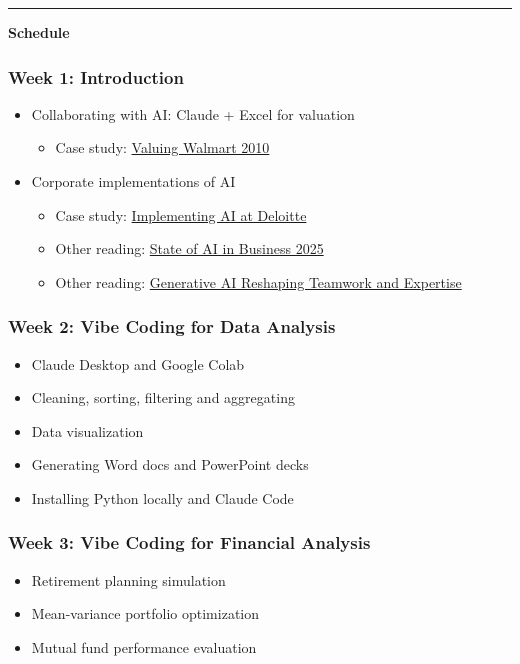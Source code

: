\documentclass[11pt]{article}
\begin{document}
\vspace{1cm}
\hrule
\vspace{0.5cm}

\begin{center}
\textbf{\Large  Schedule}
\end{center}

\subsubsection*{Week 1: Introduction}
\begin{itemize}\setlength{\itemsep}{0pt}
\item Collaborating with AI: Claude + Excel for valuation
\begin{itemize}
\item Case study: \href{https://hbsp.harvard.edu/product/W11058-PDF-ENG}{Valuing Walmart 2010}
\end{itemize}
\item Corporate implementations of AI
\begin{itemize}

\item Case study: \href{https://hbsp.harvard.edu/product/HEC382-PDF-ENG}{Implementing AI at Deloitte}
\item Other reading: 
\href{https://mlq.ai/media/quarterly_decks/v0.1_State_of_AI_in_Business_2025_Report.pdf}{State of AI in Business 2025}
\item
Other reading: \href{https://papers.ssrn.com/sol3/papers.cfm?abstract_id=5188231}{Generative AI Reshaping Teamwork and Expertise}
\end{itemize}
\end{itemize}

\subsubsection*{Week 2: Vibe Coding for Data Analysis}
\begin{itemize}\setlength{\itemsep}{0pt}
\item Claude Desktop and Google Colab
\item Cleaning, sorting, filtering and aggregating
\item Data visualization
\item Generating Word docs and PowerPoint decks 
\item Installing Python locally and Claude Code
\end{itemize}

\subsubsection*{Week 3: Vibe Coding for Financial Analysis}
\begin{itemize}\setlength{\itemsep}{0pt}
\item Retirement planning simulation
\item Mean-variance portfolio optimization
\item Mutual fund performance evaluation 
\end{itemize}
\end{document}
